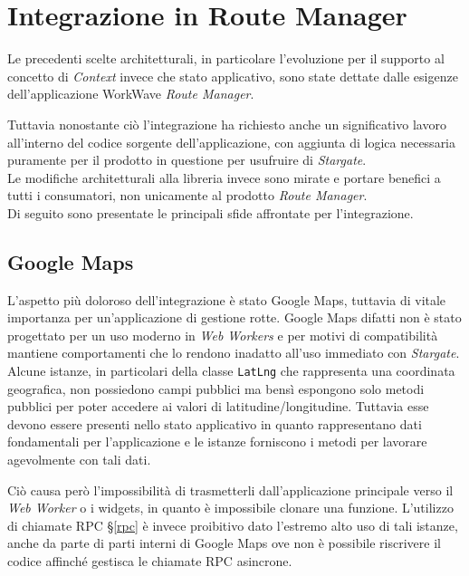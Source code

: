 
\chapter{Integrazione in Route Manager}
\label{cap:integrazione}

Le precedenti scelte architetturali, in particolare l'evoluzione per il supporto al concetto di \textit{Context} invece che stato applicativo, sono state dettate dalle esigenze dell'applicazione WorkWave \textit{Route Manager}. 

Tuttavia nonostante ciò l'integrazione ha richiesto anche un significativo lavoro all'interno del codice sorgente dell'applicazione, con aggiunta di logica necessaria puramente per il prodotto in questione per usufruire di \textit{Stargate}. \\

Le modifiche architetturali alla libreria invece sono mirate e portare benefici a tutti i consumatori, non unicamente al prodotto \textit{Route Manager}. \\

Di seguito sono presentate le principali sfide affrontate per l'integrazione.

\section{Google Maps}

L'aspetto più doloroso dell'integrazione è stato Google Maps, tuttavia di vitale importanza per un'applicazione di gestione rotte. Google Maps difatti non è stato progettato per un uso moderno in \textit{Web Workers} e per motivi di compatibilità mantiene comportamenti che lo rendono inadatto all'uso immediato con \textit{Stargate}. \\

Alcune istanze, in particolari della classe \texttt{LatLng} che rappresenta una coordinata geografica, non possiedono campi pubblici ma bensì espongono solo metodi pubblici per poter accedere ai valori di latitudine/longitudine. Tuttavia esse devono essere presenti nello stato applicativo in quanto rappresentano dati fondamentali per l'applicazione e le istanze forniscono i metodi per lavorare agevolmente con tali dati.

Ciò causa però l'impossibilità di trasmetterli dall'applicazione principale verso il \textit{Web Worker} o i widgets, in quanto è impossibile clonare una funzione. L'utilizzo di chiamate RPC §\ref{rpc} è invece proibitivo dato l'estremo alto uso di tali istanze, anche da parte di parti interni di Google Maps ove non è possibile riscrivere il codice affinché gestisca le chiamate RPC asincrone. \\

